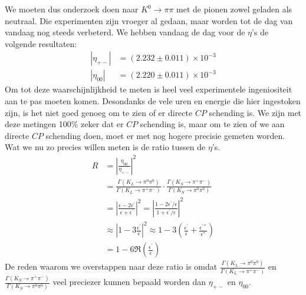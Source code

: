 \documentclass[../main.tex]{subfiles}
\begin{document}
We moeten dus onderzoek doen naar $K^{0} \rightarrow \pi \pi$ met de pionen zowel geladen als neutraal. Die experimenten zijn vroeger al gedaan, maar worden tot de dag van vandaag nog steeds verbeterd. We hebben vandaag de dag voor de $\eta$'s de volgende resultaten:
\begin{equation}
    \begin{aligned}
        \label{eq:hedendaagse_eta}
        \left|\eta_{+-}\right| &=(2.232 \pm 0.011) \times 10^{-3} \\
        \left|\eta_{00}\right| &=(2.220 \pm 0.011) \times 10^{-3}
    \end{aligned}
\end{equation}
Om tot deze waarschijnlijkheid te meten is heel veel experimentele ingeniositeit aan te pas moeten komen. Desondanks de vele uren en energie die hier ingestoken zijn, is het niet goed genoeg om te zien of er directe $CP$ schending is. We zijn met deze metingen 100\% zeker dat er $CP$ schending is, maar om te zien of we aan directe $CP$ schending doen, moet er met nog hogere precisie gemeten worden. Wat we nu zo precies willen meten is de ratio tussen de $\eta$'s.
\begin{equation}
    \begin{aligned}
        \label{eq:eta_ratio}
        R&=\left|\frac{\eta_{00}}{\eta_{+-}}\right|^{2}\\
         &=\frac{\Gamma\left(K_{L} \rightarrow \pi^{0} \pi^{0}\right)}{\Gamma\left(K_{L} \rightarrow \pi^{+} \pi^{-}\right)} \cdot \frac{\Gamma\left(K_{S} \rightarrow \pi^{+} \pi^{-}\right)}{\Gamma\left(K_{S} \rightarrow \pi^{0} \pi^{0}\right)} \\
         &=\left|\frac{\epsilon-2 \epsilon^{\prime}}{\epsilon+\epsilon^{\prime}}\right|^{2}=\left|\frac{1-2 \epsilon^{\prime} / \epsilon}{1+\epsilon^{\prime} / \epsilon}\right|^{2} \\
         &\approx\left|1-3 \frac{\epsilon^{\prime}}{\epsilon}\right|^{2} \approx 1-3\left(\frac{\epsilon^{\prime}}{\epsilon}+\frac{\epsilon^{\prime *}}{\epsilon^{*}}\right) \\
         &=1-6 \Re\left(\frac{\epsilon^{\prime}}{\epsilon}\right)
    \end{aligned}
\end{equation}
De reden waarom we overstappen naar deze ratio is omdat $\frac{\Gamma\left(K_{L} \rightarrow \pi^{0} \pi^{0}\right)}{\Gamma\left(K_{L} \rightarrow \pi^{+} \pi^{-}\right)}$ en $\frac{\Gamma\left(K_{S} \rightarrow \pi^{+} \pi^{-}\right)}{\Gamma\left(K_{S} \rightarrow \pi^{0} \pi^{0}\right)}$ veel preciezer kunnen bepaald worden dan $\eta_{+-}$ en $\eta_{00}$.\\
\end{document}
